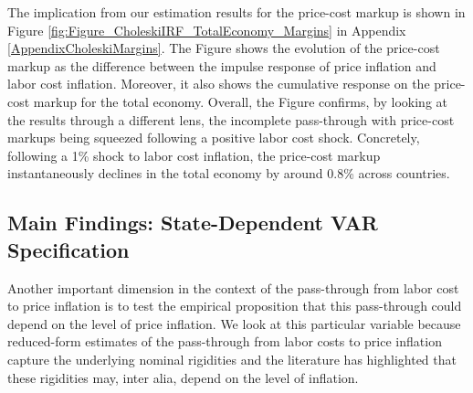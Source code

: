 \documentclass[11pt]{article}
\begin{document}

The implication from our estimation results for the price-cost markup is shown in Figure \ref{fig:Figure_CholeskiIRF_TotalEconomy_Margins} in Appendix \ref{AppendixCholeskiMargins}. The Figure shows the evolution of the price-cost markup as the difference between the impulse response of price inflation and labor cost inflation. Moreover, it also shows the cumulative response on the price-cost markup for the total economy. Overall, the Figure confirms, by looking at the results through a different lens, the incomplete pass-through with price-cost markups being squeezed following a positive labor cost shock.  Concretely, following a 1\% shock to labor cost inflation, the price-cost markup instantaneously declines in the total economy
by around 0.8\% across countries.


\subsection{Main Findings: State-Dependent VAR Specification}

Another important dimension in the context of the pass-through from labor cost to price inflation is to test the empirical proposition that this pass-through could depend on the level of price inflation. We look at this particular variable because reduced-form estimates of the pass-through from labor costs to price inflation capture the underlying nominal rigidities and the literature has highlighted that these rigidities may, inter alia, depend on the level of inflation. 
\end{document}
